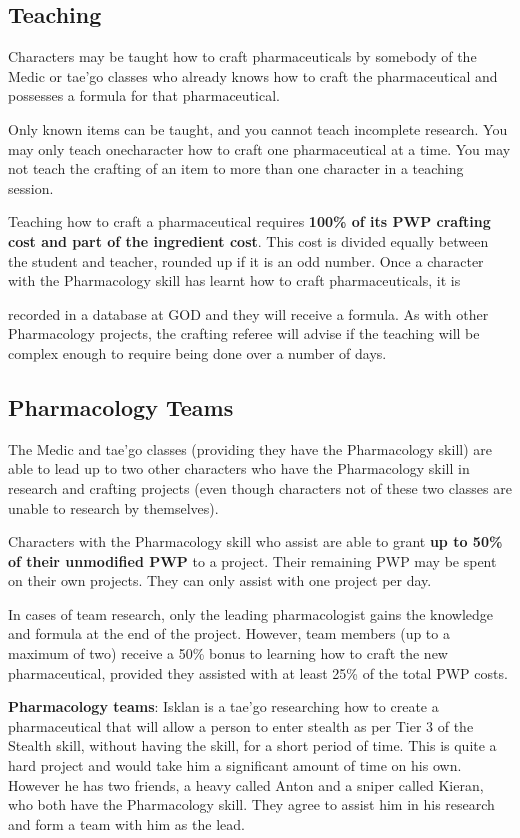 \documentclass{scrbook}
\begin{document}
    \subsection{Teaching}

Characters may be taught how to craft pharmaceuticals by somebody of the Medic or tae'go classes who already knows how to craft the pharmaceutical and possesses a formula for that pharmaceutical.

Only known items can be taught, and you cannot teach incomplete research. You may only teach onecharacter how to craft one pharmaceutical at a time. You may not teach the crafting of an item to more than one character in a teaching session.

Teaching how to craft a pharmaceutical requires \textbf{100\% of its PWP crafting cost and part of the ingredient cost}. This cost is divided equally between the student and teacher, rounded up if it is an odd number. Once a character with the Pharmacology skill has learnt how to craft pharmaceuticals, it is

recorded in a database at GOD and they will receive a formula. As with other Pharmacology projects, the crafting referee will advise if the teaching will be complex enough to require being done over a number of days.

\subsection{Pharmacology Teams}

The Medic and tae'go classes (providing they have the Pharmacology skill) are able to lead up to two other characters who have the Pharmacology skill in research and crafting projects (even though characters not of these two classes are unable to research by themselves).

Characters with the Pharmacology skill who assist are able to grant \textbf{up to 50\% of their unmodified PWP} to a project. Their remaining PWP may be spent on their own projects. They can only assist with one project per day.

In cases of team research, only the leading pharmacologist gains the knowledge and formula at the end of the project. However, team members (up to a maximum of two) receive a 50\% bonus to learning how to craft the new pharmaceutical, provided they assisted with at least 25\% of the total PWP costs.

\textbf{Pharmacology teams}: Isklan is a tae'go researching how to create a pharmaceutical that will allow a person to enter stealth as per Tier 3 of the Stealth skill, without having the skill, for a short period of time. This is quite a hard project and would take him a significant amount of time on his own. However he has two friends, a heavy called Anton and a sniper called Kieran, who both have the Pharmacology skill. They agree to assist him in his research and form a team with him as the lead.
\end{document}
